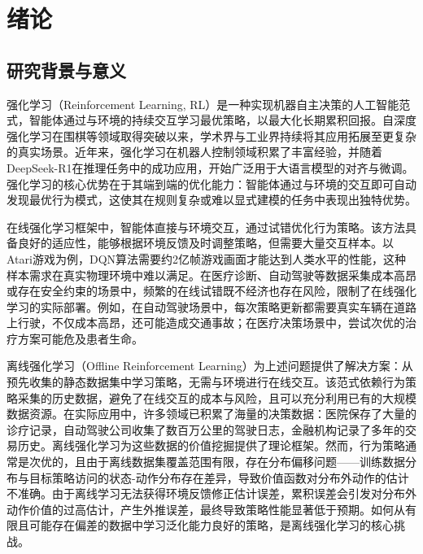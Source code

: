 \chapter{绪论}\label{Chap:chap1}


\section{研究背景与意义}\label{Sec1.1}

强化学习（Reinforcement Learning, RL）是一种实现机器自主决策的人工智能范式，智能体通过与环境的持续交互学习最优策略，以最大化长期累积回报\cite{Levine2020OfflineRL}。自深度强化学习在围棋\cite{Silver2016AlphaGo}等领域取得突破以来，学术界与工业界持续将其应用拓展至更复杂的真实场景。近年来，强化学习在机器人控制\cite{Johannink2019Residual}领域积累了丰富经验，并随着DeepSeek-R1\cite{DeepSeekAI2025R1}在推理任务中的成功应用，开始广泛用于大语言模型的对齐与微调。强化学习的核心优势在于其端到端的优化能力：智能体通过与环境的交互即可自动发现最优行为模式，这使其在规则复杂或难以显式建模的任务中表现出独特优势。

在线强化学习框架中，智能体直接与环境交互，通过试错优化行为策略。该方法具备良好的适应性，能够根据环境反馈及时调整策略，但需要大量交互样本。以Atari游戏为例，DQN算法需要约2亿帧游戏画面才能达到人类水平的性能，这种样本需求在真实物理环境中难以满足。在医疗诊断\cite{Gottesman2019Healthcare}、自动驾驶\cite{Kiran2022Driving}等数据采集成本高昂或存在安全约束的场景中，频繁的在线试错既不经济也存在风险，限制了在线强化学习的实际部署。例如，在自动驾驶场景中，每次策略更新都需要真实车辆在道路上行驶，不仅成本高昂，还可能造成交通事故；在医疗决策场景中，尝试次优的治疗方案可能危及患者生命。

离线强化学习（Offline Reinforcement Learning）为上述问题提供了解决方案：从预先收集的静态数据集中学习策略，无需与环境进行在线交互。该范式依赖行为策略采集的历史数据，避免了在线交互的成本与风险，且可以充分利用已有的大规模数据资源。在实际应用中，许多领域已积累了海量的决策数据：医院保存了大量的诊疗记录，自动驾驶公司收集了数百万公里的驾驶日志，金融机构记录了多年的交易历史。离线强化学习为这些数据的价值挖掘提供了理论框架。然而，行为策略通常是次优的，且由于离线数据集覆盖范围有限，存在分布偏移问题\cite{Fujimoto2019BCQ}——训练数据分布与目标策略访问的状态-动作分布存在差异，导致价值函数对分布外动作的估计不准确。由于离线学习无法获得环境反馈修正估计误差，累积误差会引发对分布外动作价值的过高估计，产生外推误差\cite{Liu2020Provably}，最终导致策略性能显著低于预期。如何从有限且可能存在偏差的数据中学习泛化能力良好的策略，是离线强化学习的核心挑战。

